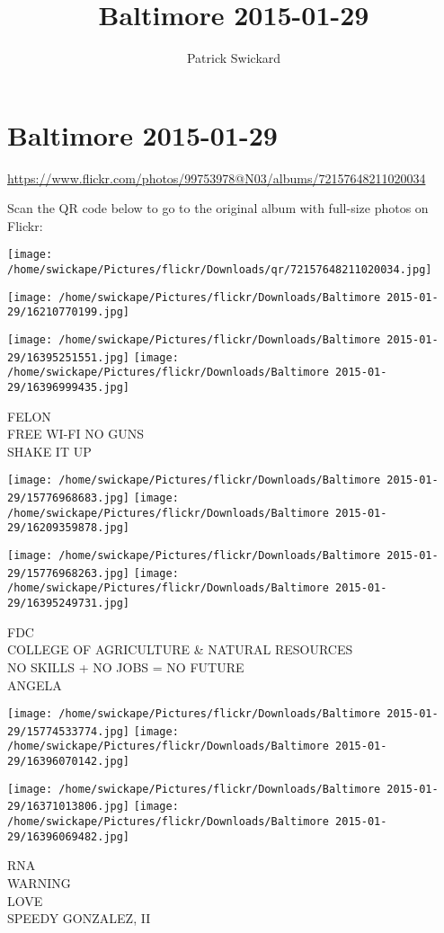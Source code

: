 \documentclass[10pt,letterpaper]{article}
\title{Baltimore 2015-01-29}
\author{Patrick Swickard}
\date{}
\begin{document}
\section*{Baltimore 2015-01-29}

\url{https://www.flickr.com/photos/99753978@N03/albums/72157648211020034}

Scan the QR code below to go to the original album with full-size photos on Flickr:

\texttt{[image: /home/swickape/Pictures/flickr/Downloads/qr/72157648211020034.jpg]}
\pagebreak

\texttt{[image: /home/swickape/Pictures/flickr/Downloads/Baltimore 2015-01-29/16210770199.jpg]}

\vspace{0.25in}
\texttt{[image: /home/swickape/Pictures/flickr/Downloads/Baltimore 2015-01-29/16395251551.jpg]}
\texttt{[image: /home/swickape/Pictures/flickr/Downloads/Baltimore 2015-01-29/16396999435.jpg]}

FELON\\
FREE WI{-}FI NO GUNS\\
SHAKE IT UP
\pagebreak

\texttt{[image: /home/swickape/Pictures/flickr/Downloads/Baltimore 2015-01-29/15776968683.jpg]}
\texttt{[image: /home/swickape/Pictures/flickr/Downloads/Baltimore 2015-01-29/16209359878.jpg]}

\texttt{[image: /home/swickape/Pictures/flickr/Downloads/Baltimore 2015-01-29/15776968263.jpg]}
\texttt{[image: /home/swickape/Pictures/flickr/Downloads/Baltimore 2015-01-29/16395249731.jpg]}

FDC\\
COLLEGE OF AGRICULTURE \& NATURAL RESOURCES\\
NO SKILLS + NO JOBS = NO FUTURE\\
ANGELA
\pagebreak

\texttt{[image: /home/swickape/Pictures/flickr/Downloads/Baltimore 2015-01-29/15774533774.jpg]}
\texttt{[image: /home/swickape/Pictures/flickr/Downloads/Baltimore 2015-01-29/16396070142.jpg]}

\texttt{[image: /home/swickape/Pictures/flickr/Downloads/Baltimore 2015-01-29/16371013806.jpg]}
\texttt{[image: /home/swickape/Pictures/flickr/Downloads/Baltimore 2015-01-29/16396069482.jpg]}

RNA\\
WARNING\\
LOVE\\
SPEEDY GONZALEZ, II
\pagebreak
\end{document}
